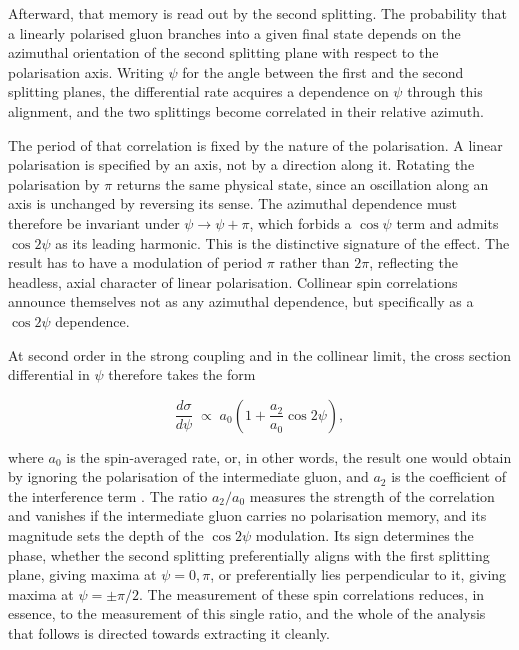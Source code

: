 Afterward, that memory is read out by the second splitting. The probability that a linearly
polarised gluon branches into a given final state depends on the azimuthal orientation
of the second splitting plane with respect to the polarisation axis. Writing $\psi$ for the angle between the first
and the second splitting planes, the differential rate acquires a dependence on $\psi$ through
this alignment, and the two splittings become correlated in their relative azimuth.

The period of that correlation is fixed by the nature of the polarisation. A
linear polarisation is specified by an axis, not by a direction along it. Rotating
the polarisation by $\pi$ returns the same physical state, since an oscillation
along an axis is unchanged by reversing its sense. The azimuthal dependence must
therefore be invariant under $\psi \to \psi + \pi$, which forbids a $\cos\psi$ term
and admits $\cos 2\psi$ as its leading harmonic. This is the distinctive signature of the effect.
The result has to have a modulation of period $\pi$ rather than $2\pi$, reflecting the
headless, axial character of linear polarisation. Collinear spin correlations
announce themselves not as any azimuthal dependence, but specifically as a
$\cos 2\psi$ dependence.

At second order in the strong coupling and in the collinear limit, the cross
section differential in $\psi$ therefore takes the form

\begin{equation}
  \frac{d\sigma}{d\psi} \;\propto\; a_0 \left( 1 + \frac{a_2}{a_0}\cos 2\psi \right),
  \label{eq:cos2psi}
\end{equation}

where $a_0$ is the spin-averaged rate, or, in other words, the result one would obtain by ignoring
the polarisation of the intermediate gluon, and $a_2$ is the coefficient of the
interference term \cite{Karlberg_2021}. The ratio $a_2/a_0$ measures the strength of the correlation and 
vanishes if the intermediate gluon carries no polarisation memory, and its
magnitude sets the depth of the $\cos 2\psi$ modulation. Its sign determines the
phase, whether the second splitting preferentially aligns with the first
splitting plane, giving maxima at $\psi = 0, \pi$, or preferentially lies
perpendicular to it, giving maxima at $\psi = \pm\pi/2$. The measurement of these
spin correlations reduces, in essence, to the measurement of this single ratio,
and the whole of the analysis that follows is directed towards extracting it
cleanly.

